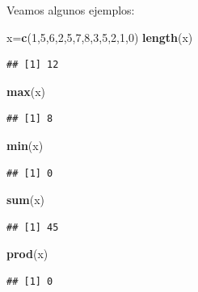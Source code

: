 \documentclass[]{book}
\newenvironment{Shaded}{\begin{snugshade}}{\end{snugshade}}
\newcommand{\DecValTok}[1]{\textcolor[rgb]{0.00,0.00,0.81}{#1}}
\newcommand{\KeywordTok}[1]{\textcolor[rgb]{0.13,0.29,0.53}{\textbf{#1}}}
\newcommand{\NormalTok}[1]{#1}
\theoremstyle{definition}
\theoremstyle{definition}
\theoremstyle{definition}
\theoremstyle{remark}
\begin{document}
Veamos algunos ejemplos:

\begin{Shaded}
\begin{Highlighting}[]
\NormalTok{x=}\KeywordTok{c}\NormalTok{(}\DecValTok{1}\NormalTok{,}\DecValTok{5}\NormalTok{,}\DecValTok{6}\NormalTok{,}\DecValTok{2}\NormalTok{,}\DecValTok{5}\NormalTok{,}\DecValTok{7}\NormalTok{,}\DecValTok{8}\NormalTok{,}\DecValTok{3}\NormalTok{,}\DecValTok{5}\NormalTok{,}\DecValTok{2}\NormalTok{,}\DecValTok{1}\NormalTok{,}\DecValTok{0}\NormalTok{)}
\KeywordTok{length}\NormalTok{(x)}
\end{Highlighting}
\end{Shaded}

\begin{verbatim}
## [1] 12
\end{verbatim}

\begin{Shaded}
\begin{Highlighting}[]
\KeywordTok{max}\NormalTok{(x)}
\end{Highlighting}
\end{Shaded}

\begin{verbatim}
## [1] 8
\end{verbatim}

\begin{Shaded}
\begin{Highlighting}[]
\KeywordTok{min}\NormalTok{(x)}
\end{Highlighting}
\end{Shaded}

\begin{verbatim}
## [1] 0
\end{verbatim}

\begin{Shaded}
\begin{Highlighting}[]
\KeywordTok{sum}\NormalTok{(x)}
\end{Highlighting}
\end{Shaded}

\begin{verbatim}
## [1] 45
\end{verbatim}

\begin{Shaded}
\begin{Highlighting}[]
\KeywordTok{prod}\NormalTok{(x)}
\end{Highlighting}
\end{Shaded}

\begin{verbatim}
## [1] 0
\end{verbatim}
\end{document}
